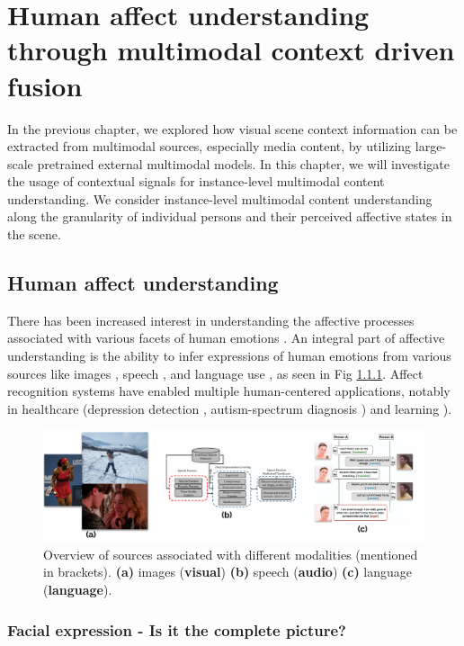 \chapter{Human affect understanding through multimodal context driven fusion}
In the previous chapter, we explored how visual scene context information can be extracted from multimodal sources, especially media content, by utilizing large-scale pretrained external multimodal models. In this chapter, we will investigate the usage of contextual signals for instance-level multimodal content understanding. We consider instance-level multimodal content understanding along the granularity of individual persons and their perceived affective states in the scene. 
\section{Human affect understanding}
 There has been increased interest in understanding the affective processes associated with various facets of human emotions \cite{dukes2021}. An integral part of affective understanding is the ability to infer expressions of human emotions from various sources like images \cite{AICA}, speech \cite{speechemo}, and language use \cite{Poria2019EmotionRI}, as seen in Fig \ref{}. Affect recognition systems have enabled multiple human-centered applications, notably in healthcare (depression detection \cite{depressiondetection}, autism-spectrum diagnosis \cite{autismguha}) and learning \cite{savchecnkoengagement}).

\begin{figure}[h!]
    \centering
    \includegraphics[width=\textwidth]{figures/emotion_overview.pdf}
    \caption{Overview of sources associated with different modalities (mentioned in brackets). \textbf{(a)} images (\textbf{visual}) \textbf{(b)} speech (\textbf{audio}) \textbf{(c)} language (\textbf{language}).}
    \label{emotion overview}
\end{figure}

 
\subsection{Facial expression - Is it the complete picture?}

